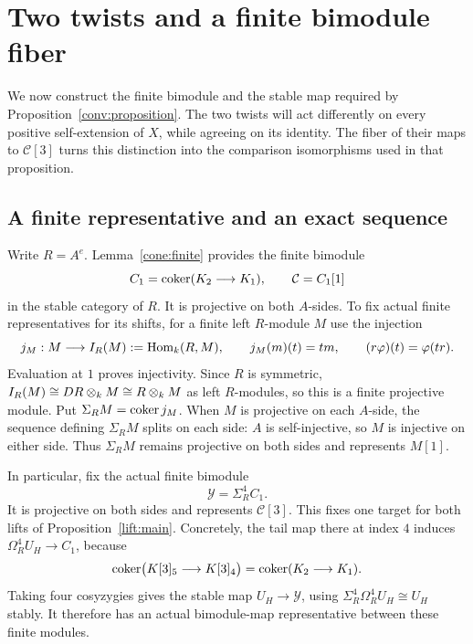 \section{Two twists and a finite bimodule fiber}
\label{branch:section}

We now construct the finite bimodule and the stable map required by
Proposition~\ref{conv:proposition}.  The two twists will act differently on every
positive self-extension of $X$, while agreeing on its identity.  The fiber
of their maps to $\mathcal C[3]$ turns this distinction into the comparison
isomorphisms used in that proposition.

\subsection{A finite representative and an exact sequence}

Write $R=A^e$.  Lemma~\ref{cone:finite} provides the finite bimodule
\[
 C_1=\operatorname{coker}(K_2\longrightarrow K_1),
 \qquad \mathcal C=C_1[1]
\]
in the stable category of $R$.  It is projective on both $A$-sides.  To fix
actual finite representatives for its shifts, for a finite left $R$-module
$M$ use the injection
\begin{equation}
 \label{branch:finite-embedding}
 j_M:M\longrightarrow I_R(M):=\operatorname{Hom}_{k}(R,M),
 \qquad j_M(m)(t)=tm,
 \qquad (r\varphi)(t)=\varphi(tr).
\end{equation}
Evaluation at $1$ proves injectivity.  Since $R$ is symmetric,
$I_R(M)\cong DR\otimes_{k}M\cong R\otimes_{k}M$ as left $R$-modules,
so this is a finite projective module.  Put
$\Sigma_RM=\operatorname{coker} j_M$.  When $M$ is projective on each $A$-side, the
sequence defining $\Sigma_RM$ splits on each side: $A$ is self-injective,
so $M$ is injective on either side.  Thus $\Sigma_RM$ remains projective
on both sides and represents $M[1]$.

In particular, fix the actual finite bimodule
\begin{equation}
 \label{branch:Y}
 \mathcal Y=\Sigma_R^4C_1.
\end{equation}
It is projective on both sides and represents $\mathcal C[3]$.  This fixes
one target for both lifts of Proposition~\ref{lift:main}.  Concretely, the
tail map there at index $4$ induces
$\Omega_R^4U_H\to C_1$, because
\[
 \operatorname{coker}\bigl(K[3]_5\longrightarrow K[3]_4\bigr)
 =\operatorname{coker}(K_2\longrightarrow K_1).
\]
Taking four cosyzygies gives the stable map $U_H\to \mathcal Y$, using
$\Sigma_R^4\Omega_R^4U_H\cong U_H$ stably.  It therefore has an actual
bimodule-map representative between these finite modules.

